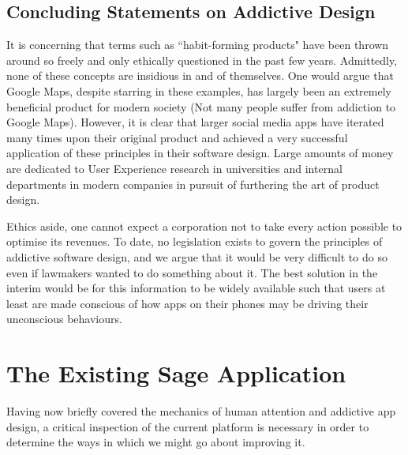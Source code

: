 \subsection{Concluding Statements on Addictive Design}
It is concerning that terms such as ``habit-forming products" have been thrown around so freely and only ethically questioned in the past few years. Admittedly, none of these concepts are insidious in and of themselves. One would argue that Google Maps, despite starring in these examples, has largely been an extremely beneficial product for modern society (Not many people suffer from addiction to Google Maps). However, it is clear that larger social media apps have iterated many times upon their original product and achieved a very successful application of these principles in their software design. Large amounts of money are dedicated to User Experience research in universities and internal departments in modern companies in pursuit of furthering the art of product design.

Ethics aside, one cannot expect a corporation not to take every action possible to optimise its revenues. To date, no legislation exists to govern the principles of addictive software design, and we argue that it would be very difficult to do so even if lawmakers wanted to do something about it. The best solution in the interim would be for this information to be widely available such that users at least are made conscious of how apps on their phones may be driving their unconscious behaviours.

\section{The Existing Sage Application}
Having now briefly covered the mechanics of human attention and addictive app design, a critical inspection of the current platform is necessary in order to determine the ways in which we might go about improving it.

